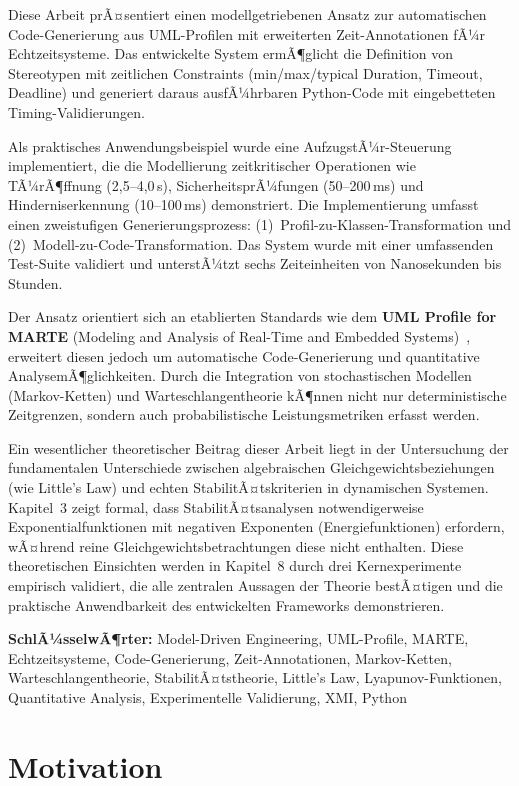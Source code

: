 ﻿\documentclass[a4paper,12pt]{report}
\theoremstyle{definition}
\begin{document}
Diese Arbeit prÃ¤sentiert einen modellgetriebenen Ansatz zur automatischen
Code-Gene\-rierung aus UML-Profilen mit erweiterten Zeit-Annotationen fÃ¼r
Echtzeitsysteme. Das entwickelte System ermÃ¶glicht die Definition von
Stereotypen mit zeitlichen Constraints (min/max/typical Duration, Timeout,
Deadline) und generiert daraus ausfÃ¼hrbaren Py\-thon-Code mit eingebetteten
Timing-Validierungen.

Als praktisches Anwendungsbeispiel wurde eine AufzugstÃ¼r-Steuerung
implementiert, die die Modellierung zeitkritischer Operationen wie
TÃ¼rÃ¶ffnung (2{,}5--4{,}0\,s), SicherheitsprÃ¼fungen (50--200\,ms) und
Hinderniserkennung (10--100\,ms) demonstriert. Die Implementierung umfasst
einen zweistufigen Generierungsprozess: (1)~Profil-zu-Klassen-Transfor\-mation
und (2)~Modell-zu-Code-Transformation. Das System wurde mit einer
umfassenden Test-Suite validiert und unterstÃ¼tzt sechs Zeiteinheiten von
Nanosekunden bis Stunden.

Der Ansatz orientiert sich an etablierten Standards wie dem
\textbf{UML Profile for MARTE} (Modeling and Analysis of Real-Time and
Embedded Systems)~\cite{marte}, erweitert diesen jedoch um automatische
Code-Generierung und quantitative AnalysemÃ¶glichkeiten. Durch die Integration
von stochastischen Modellen (Markov-Ketten) und Warteschlangentheorie
kÃ¶nnen nicht nur deterministische Zeitgrenzen, sondern auch probabilistische
Leistungsmetriken erfasst werden.

Ein wesentlicher theoretischer Beitrag dieser Arbeit liegt in der Untersuchung
der fundamentalen Unterschiede zwischen algebraischen Gleichgewichtsbeziehungen
(wie Little's Law) und echten StabilitÃ¤tskriterien in dynamischen Systemen.
Kapitel~3 zeigt formal, dass StabilitÃ¤tsanalysen notwendigerweise
Exponentialfunktionen mit negativen Exponenten (Energiefunktionen) erfordern,
wÃ¤hrend reine Gleichgewichtsbetrachtungen diese nicht enthalten. Diese
theoretischen Einsichten werden in Kapitel~8 durch drei Kernexperimente
empirisch validiert, die alle zentralen Aussagen der Theorie bestÃ¤tigen und
die praktische Anwendbarkeit des entwickelten Frameworks demonstrieren.

\textbf{SchlÃ¼sselwÃ¶rter:} Model-Driven Engineering, UML-Profile, MARTE,
Echtzeitsysteme, Code-Gene\-rierung, Zeit-Annotationen, Markov-Ketten,
Warteschlangentheorie, StabilitÃ¤tstheorie, Little's Law, Lyapunov-Funktionen,
Quantitative Analysis, Experimentelle Validierung, XMI, Python


\section{Motivation}
\end{document}
